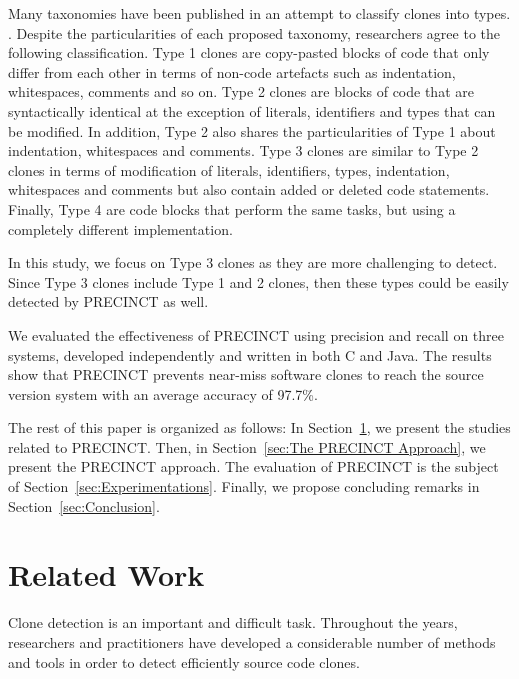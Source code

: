 \documentclass[conference]{IEEEtran}
\begin{document}

Many taxonomies have been published in an attempt to classify clones into types. \cite{Mayrand1996,Balazinska1999,Koschke2006,Bellon2007,NeilDavey,Kontogiannis,Kapser}.
Despite the particularities of each proposed taxonomy, researchers agree to the following classification.
Type 1 clones are copy-pasted blocks of code that only differ from each other in terms of non-code artefacts such as indentation, whitespaces, comments and so on.
Type 2 clones are blocks of code that are syntactically identical at the exception of literals, identifiers and types that can be modified.
In addition, Type 2 also shares the particularities of Type 1 about indentation, whitespaces and comments.
Type 3 clones are similar to Type 2 clones in terms of modification of literals, identifiers, types, indentation, whitespaces and comments but also contain added or deleted code statements.
Finally, Type 4 are code blocks that perform the same tasks, but using a completely different implementation.

In this study, we focus on Type 3 clones as they are more challenging to detect. Since Type 3 clones include Type 1 and 2 clones, then these types could be easily detected by PRECINCT as well.

We evaluated the effectiveness of PRECINCT using precision and recall on three systems, developed independently and written in both C and Java. The results show that PRECINCT prevents near-miss software clones to reach the source version system with an average accuracy of 97.7\%.

The rest of this paper is organized as follows: In Section~\ref{sec:Related Work}, we present the studies related to PRECINCT. Then, in Section~\ref{sec:The PRECINCT Approach}, we present the PRECINCT approach. The evaluation of PRECINCT is the subject of  Section~\ref{sec:Experimentations}.
Finally, we propose concluding remarks in Section~\ref{sec:Conclusion}.

\section{Related Work}
\label{sec:Related Work}

Clone detection is an important and difficult task. Throughout the years, researchers and practitioners have developed a considerable number of methods and tools in order to detect efficiently source code clones.
\end{document}
